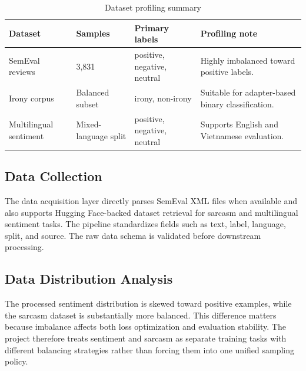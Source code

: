 \documentclass[12pt, a4paper]{article}
\begin{document}
\begin{table}[H]
\centering
\caption{Dataset profiling summary}
\begin{tabularx}{\textwidth}{@{} p{3.2cm} p{2cm} p{2cm} X @{}}
\toprule
\textbf{Dataset} & \textbf{Samples} & \textbf{Primary labels} & \textbf{Profiling note} \\
\midrule
SemEval reviews & 3,831 & positive, negative, neutral & Highly imbalanced toward positive labels. \\
Irony corpus & Balanced subset & irony, non-irony & Suitable for adapter-based binary classification. \\
Multilingual sentiment & Mixed-language split & positive, negative, neutral & Supports English and Vietnamese evaluation. \\
\bottomrule
\end{tabularx}
\end{table}

\subsection{Data Collection}
The data acquisition layer directly parses SemEval XML files when available and also supports Hugging Face-backed dataset retrieval for sarcasm and multilingual sentiment tasks. The pipeline standardizes fields such as text, label, language, split, and source. The raw data schema is validated before downstream processing.

\subsection{Data Distribution Analysis}
The processed sentiment distribution is skewed toward positive examples, while the sarcasm dataset is substantially more balanced. This difference matters because imbalance affects both loss optimization and evaluation stability. The project therefore treats sentiment and sarcasm as separate training tasks with different balancing strategies rather than forcing them into one unified sampling policy.
\end{document}
